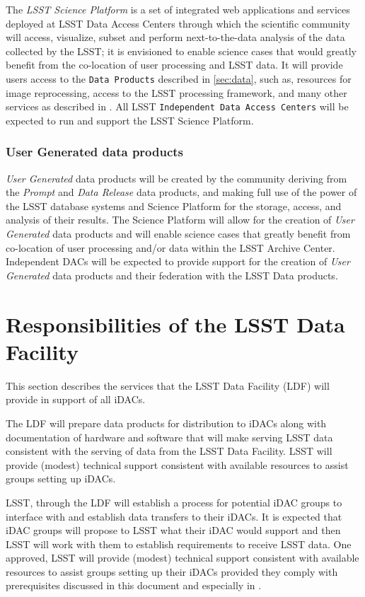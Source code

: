 The {\it LSST Science Platform}   is a set of integrated web applications and services deployed at  LSST Data Access Centers through which the scientific community will access, visualize, subset and perform next-to-the-data analysis of the data collected by the LSST; it is envisioned to enable science cases that would greatly benefit from the co-location of user processing and LSST data. It will provide users access to the {\tt Data Products} described in \ref{sec:data}, such as, resources for image reprocessing, access to the LSST processing framework, and many other services as described in .  All LSST {\tt Independent Data Access Centers} will be expected to run and support the LSST Science Platform. 

\subsubsection{User Generated data products }

{\it User Generated} data products will be created by the community deriving from the {\it Prompt} and {\it Data Release} data products, and making  full use of the power of the LSST database systems and
Science Platform for the storage, access, and analysis of their results.
The Science Platform will allow for the creation of {\it User Generated} data products and will enable science cases that greatly benefit from co-location of user processing and/or data within the LSST Archive Center.  Independent DACs will be expected to provide support for the creation of {\it User Generated} data products and their federation with the LSST Data products. 

\section{Responsibilities of the LSST Data Facility}

This section describes the services that the LSST Data Facility (LDF) will provide in support of all  iDACs.

The LDF will prepare data products for distribution to iDACs along with documentation of hardware and software that will make serving LSST data consistent with the serving of data from the LSST Data Facility. LSST will provide (modest) technical support consistent with available resources to assist groups setting up iDACs. 

LSST, through the LDF will establish a process for potential iDAC groups to interface with and establish data transfers to their iDACs. It is expected that iDAC groups will propose to LSST what their iDAC would support and then LSST will work with them to establish requirements to receive LSST data. One approved, LSST will provide (modest) technical support consistent with available resources to assist groups setting up their iDACs provided they comply with prerequisites discussed in this document and especially in .

